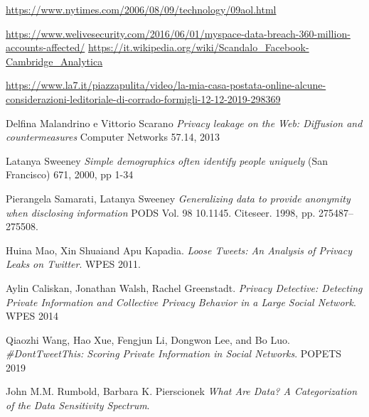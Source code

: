 \begin{thebibliography}{9}

\url{https://www.nytimes.com/2006/08/09/technology/09aol.html}

\url{https://www.welivesecurity.com/2016/06/01/myspace-data-breach-360-million-accounts-affected/}
\url{https://it.wikipedia.org/wiki/Scandalo_Facebook-Cambridge_Analytica}

\url{https://www.la7.it/piazzapulita/video/la-mia-casa-postata-online-alcune-considerazioni-leditoriale-di-corrado-formigli-12-12-2019-298369}

Delfina Malandrino e Vittorio Scarano\newline
\textit{Privacy leakage on the Web: Diffusion and countermeasures}\newline
Computer Networks 57.14, 2013

Latanya Sweeney\newline
\textit{Simple demographics often identify people uniquely}\newline
(San Francisco) 671, 2000, pp 1-34

Pierangela Samarati, Latanya Sweeney\newline
\textit{Generalizing data to provide anonymity when disclosing information}\newline
PODS Vol. 98 10.1145. Citeseer. 1998, pp. 275487–275508.



Huina Mao, Xin Shuaiand Apu Kapadia.\newline
\textit{Loose Tweets: An Analysis of Privacy Leaks on Twitter}. \newline
WPES 2011.


Aylin Caliskan, Jonathan Walsh, Rachel Greenstadt.\newline
\textit{Privacy Detective: Detecting Private Information and Collective Privacy Behavior in a Large Social Network}.\newline
WPES 2014

Qiaozhi Wang, Hao Xue, Fengjun Li, Dongwon Lee, and Bo Luo.\newline
\textit{\#DontTweetThis: Scoring Private Information in Social Networks}. \newline
POPETS 2019

John M.M. Rumbold, Barbara K. Pierscionek\newline
\textit{What Are Data? A Categorization of the Data Sensitivity Spectrum}.


\end{thebibliography}
